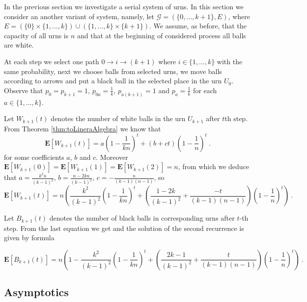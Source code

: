 \documentclass[submission]{dmtcs}
\newcommand{\E}[1]{\mathbf{E}\left[#1\right]}
\begin{document}
In the previous section we investigate a serial system of urns.
In this section we consider an another variant of system,
namely, let $\mathcal{G} = (\{0,\ldots,k+1\},E)$, where
$E= (\{0\}\times\{1,\ldots,k\}) \cup (\{1,\ldots,k\}\times\{k+1\})$.
We assume, as before, that the capacity of all urns is $n$ and that at the 
beginning of considered process all balls are white.

At each step we select one path $0 \to i \to (k+1)$ where $i \in \{1,\ldots,k\}$ 
with the same probability, next we choose balls from selected urns, we move balls according 
to arrows and put a black ball in the selected place in the urn $U_0$.
Observe that $p_0=p_{k+1}=1$, $p_{0a} = \frac1k$, $p_{a(k+1)} = 1$ and 
$p_a  = \frac1k$ for each  $a \in \{1,\ldots,k\}$.

Let $W_{k+1}(t)$ denotes the number of white balls in the urn $U_{k+1}$ 
after $t$th step.
From Theorem \ref{thm:toLineraAlgebra} we know that
$$
  \E{W_{k+1}(t)} = a (1-\frac{1}{k n})^t + (b + c t)(1-\frac1n)^t~. 
$$
for some coefficients $a$, $b$ and $c$. Moreover 
$\E{W_{k+1}(0)} = \E{W_{k+1}(1)} = \E{W_{k+1}(2)} = n$, 
from which we deduce that 
$a = \frac{k^2 n}{(k-1)^2}$, 
$b = \frac{n-2 k n}{(k-1)^2}$,
$c = -\frac{n}{(k-1) (n-1)}$, so
$$
  \E{W_{k+1}(t)} = n
	\left( 
	\frac{k^2}{(k-1)^2}\left(1-\frac{1}{k n}\right)^t + 
	\left(\frac{1-2 k}{(k-1)^2} + \frac{-t}{(k-1) (n-1)} \right)
	\left(1-\frac1n\right)^t
	\right)~. 
$$

Let $B_{k+1}(t)$ denotes the number of black balls in corresponding 
urns after $t$-th step. From the last equation we get
and the solution of the second recurrence is given by formula

\begin{equation}
\label{paralel:last}
\E{B_{k+1}(t)} = 
n 
\left(
1 - 
\frac{k^2}{(k-1)^2} \left(1-\frac{1}{k n}\right)^t+
\left(\frac{2 k-1}{(k-1)^2} + 
\frac{t}{(k-1)(n-1)}
\right) \left(1-\frac{1}{n}\right)^t 
\right)~.
\end{equation}


\subsection{Asymptotics}
\end{document}
